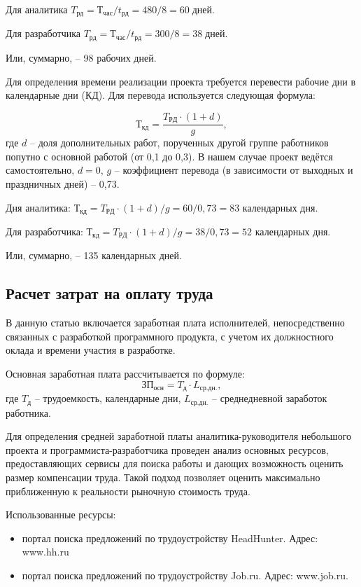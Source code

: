 Для аналитика $T_{рд} = Т_{час}/t_{рд} = 480/8 = 60 \; дней$.

Для разработчика $T_{рд} = Т_{час}/t_{рд} = 300/8 = 38 \; дней$.

Или, суммарно, – 98 рабочих дней.

Для определения времени реализации проекта требуется перевести рабочие дни в календарные дни (КД). Для перевода используется следующая формула:

$$Т_{кд}=\frac{T_{РД} \cdot (1+d) }{g},$$
где $d$ – доля дополнительных работ, порученных другой группе работников попутно с основной работой (от 0,1 до 0,3). В нашем случае проект ведётся самостоятельно, $d = 0$, $g$ – коэффициент перевода (в зависимости от выходных и праздничных дней) – 0,73.

Дня аналитика: $Т_{кд}={T_{РД} \cdot (1+d) }/{g} = 60/0,73 = 83 $ календарных дня.

Для разработчика: $Т_{кд}={T_{РД} \cdot (1+d) }/{g} = 38/0,73 = 52 $ календарных дня.

Или, суммарно, – 135 календарных дней.

\subsection{Расчет затрат на оплату труда}

В данную статью включается заработная плата исполнителей, непосредственно связанных с разработкой программного продукта, с учетом их должностного оклада и времени участия в разработке. 

Основная заработная плата рассчитывается по формуле:
$$ЗП_{осн}=T_{д} \cdot L_{ср.дн.},$$
где $T_{д}$ – трудоемкость, календарные дни, $L_{ср.дн.}$ – среднедневной заработок работника. 

Для определения средней заработной платы аналитика-руководителя небольшого проекта и программиста-разработчика проведен анализ основных ресурсов, предоставляющих сервисы для поиска работы и дающих возможность оценить размер компенсации труда. Такой подход позволяет оценить максимально приближенную к реальности рыночную стоимость труда.

Использованные ресурсы:
\begin{itemize}
	\item портал поиска предложений по трудоустройству HeadHunter. Адрес: www.hh.ru
	\item портал поиска предложений по трудоустройству Job.ru. Адрес: www.job.ru.
\end{itemize}

